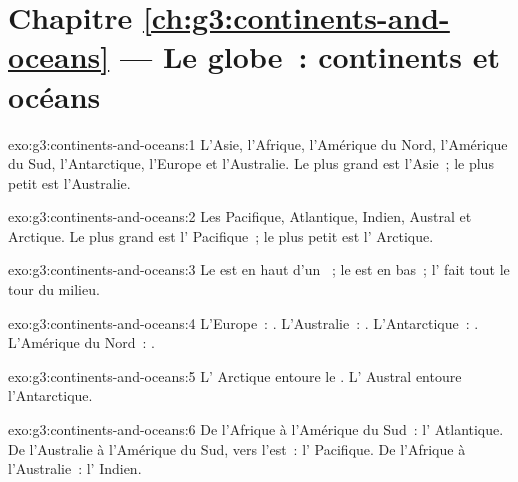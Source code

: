 \section*{Chapitre \ref{ch:g3:continents-and-oceans} --- Le globe~: continents et océans}

\begin{solution}{exo:g3:continents-and-oceans:1}
L'Asie, l'Afrique, l'Amérique du Nord, l'Amérique du Sud, l'Antarctique,
l'Europe et l'Australie. Le plus grand est l'Asie~; le plus petit est
l'Australie.
\end{solution}

\begin{solution}{exo:g3:continents-and-oceans:2}
Les  Pacifique, Atlantique, Indien, Austral et Arctique. Le plus
grand est l' Pacifique~; le plus petit est l' Arctique.
\end{solution}

\begin{solution}{exo:g3:continents-and-oceans:3}
Le  est en haut d'un ~; le  est en bas~; l'
fait tout le tour du milieu.
\end{solution}

\begin{solution}{exo:g3:continents-and-oceans:4}
L'Europe~: . L'Australie~: . L'Antarctique~:
. L'Amérique du Nord~: .
\end{solution}

\begin{solution}{exo:g3:continents-and-oceans:5}
L' Arctique entoure le . L' Austral entoure
l'Antarctique.
\end{solution}

\begin{solution}{exo:g3:continents-and-oceans:6}
De l'Afrique à l'Amérique du Sud~: l' Atlantique. De l'Australie à
l'Amérique du Sud, vers l'est~: l' Pacifique. De l'Afrique à
l'Australie~: l' Indien.
\end{solution}

